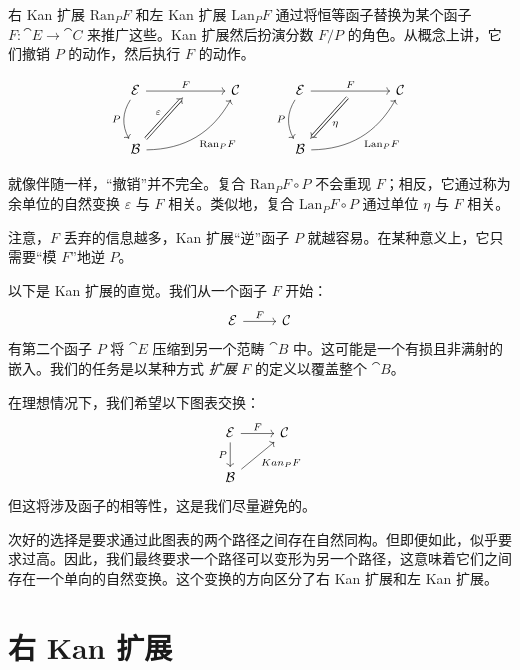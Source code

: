 \documentclass[DaoFP]{subfiles}
\begin{document}
右 Kan 扩展 $\text{Ran}_P F$ 和左 Kan 扩展 $\text{Lan}_P F$ 通过将恒等函子替换为某个函子 $F \colon \cat E \to \cat C$ 来推广这些。Kan 扩展然后扮演分数 $F/P$ 的角色。从概念上讲，它们撤销 $P$ 的动作，然后执行 $F$ 的动作。

\[
 \begin{tikzcd} [row sep=1cm, column sep=1cm]
 \cat E
 \arrow[rr, "F", "" {name=ID, below} ]
 \arrow[d, bend right, "P"']
 && \cat C
 \\
 \cat B
  \arrow[urr, bend right, "\text{Ran}_P F"']
 \arrow[Rightarrow, "\varepsilon",  to=ID]
 \end{tikzcd}
 \qquad
 \begin{tikzcd} [row sep=1cm, column sep=1cm]
 \cat E
 \arrow[rr, "F", "" {name=ID, below} ]
 \arrow[d, bend right, "P"']
 && \cat C
 \\
 \cat B
  \arrow[urr, bend right, "\text{Lan}_P F"']
 \arrow[Rightarrow, "\eta",  from=ID]
 \end{tikzcd}
\]

就像伴随一样，“撤销”并不完全。复合 $\text{Ran}_P F \circ P$ 不会重现 $F$；相反，它通过称为余单位的自然变换 $\varepsilon$ 与 $F$ 相关。类似地，复合 $\text{Lan}_P F \circ P$ 通过单位 $\eta$ 与 $F$ 相关。

注意，$F$ 丢弃的信息越多，Kan 扩展“逆”函子 $P$ 就越容易。在某种意义上，它只需要“模 $F$”地逆 $P$。

以下是 Kan 扩展的直觉。我们从一个函子 $F$ 开始：
\[
 \begin{tikzcd} \cat E
 \arrow[r, "F"]
 & \cat C
  \end{tikzcd}
\]
有第二个函子 $P$ 将 $\cat E$ 压缩到另一个范畴 $\cat B$ 中。这可能是一个有损且非满射的嵌入。我们的任务是以某种方式 \emph{扩展} $F$ 的定义以覆盖整个 $\cat B$。

在理想情况下，我们希望以下图表交换：
\[
 \begin{tikzcd} \cat E
 \arrow[r, "F"]
 \arrow[d, "P"']
 & \cat C
 \\
 \cat B
\arrow[ur, "Kan_P F"']
  \end{tikzcd}
\]
但这将涉及函子的相等性，这是我们尽量避免的。

次好的选择是要求通过此图表的两个路径之间存在自然同构。但即便如此，似乎要求过高。因此，我们最终要求一个路径可以变形为另一个路径，这意味着它们之间存在一个单向的自然变换。这个变换的方向区分了右 Kan 扩展和左 Kan 扩展。


\section{右 Kan 扩展}
\end{document}
